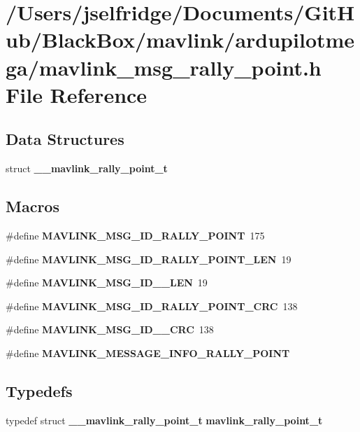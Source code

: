 \section{/\+Users/jselfridge/\+Documents/\+Git\+Hub/\+Black\+Box/mavlink/ardupilotmega/mavlink\+\_\+msg\+\_\+rally\+\_\+point.h File Reference}
\label{mavlink__msg__rally__point_8h}
\subsection*{Data Structures}
\begin{DoxyCompactItemize}
\item 
struct \textbf{ \+\_\+\+\_\+mavlink\+\_\+rally\+\_\+point\+\_\+t}
\end{DoxyCompactItemize}
\subsection*{Macros}
\begin{DoxyCompactItemize}
\item 
\#define \textbf{ M\+A\+V\+L\+I\+N\+K\+\_\+\+M\+S\+G\+\_\+\+I\+D\+\_\+\+R\+A\+L\+L\+Y\+\_\+\+P\+O\+I\+NT}~175
\item 
\#define \textbf{ M\+A\+V\+L\+I\+N\+K\+\_\+\+M\+S\+G\+\_\+\+I\+D\+\_\+\+R\+A\+L\+L\+Y\+\_\+\+P\+O\+I\+N\+T\+\_\+\+L\+EN}~19
\item 
\#define \textbf{ M\+A\+V\+L\+I\+N\+K\+\_\+\+M\+S\+G\+\_\+\+I\+D\+\_\+\_\+\+L\+EN}~19
\item 
\#define \textbf{ M\+A\+V\+L\+I\+N\+K\+\_\+\+M\+S\+G\+\_\+\+I\+D\+\_\+\+R\+A\+L\+L\+Y\+\_\+\+P\+O\+I\+N\+T\+\_\+\+C\+RC}~138
\item 
\#define \textbf{ M\+A\+V\+L\+I\+N\+K\+\_\+\+M\+S\+G\+\_\+\+I\+D\+\_\+\_\+\+C\+RC}~138
\item 
\#define \textbf{ M\+A\+V\+L\+I\+N\+K\+\_\+\+M\+E\+S\+S\+A\+G\+E\+\_\+\+I\+N\+F\+O\+\_\+\+R\+A\+L\+L\+Y\+\_\+\+P\+O\+I\+NT}
\end{DoxyCompactItemize}
\subsection*{Typedefs}
\begin{DoxyCompactItemize}
\item 
typedef struct \textbf{ \+\_\+\+\_\+mavlink\+\_\+rally\+\_\+point\+\_\+t} \textbf{ mavlink\+\_\+rally\+\_\+point\+\_\+t}
\end{DoxyCompactItemize}


